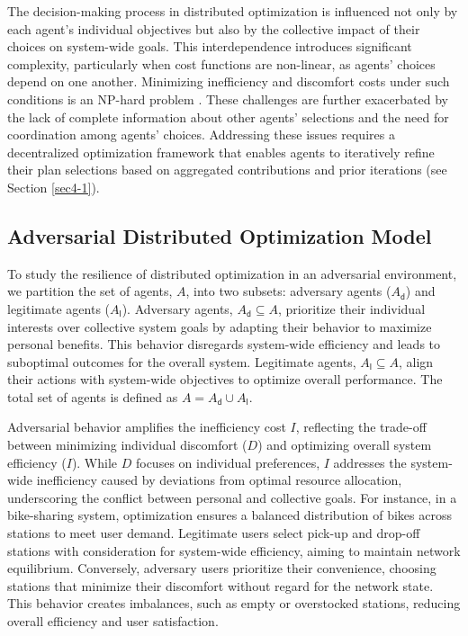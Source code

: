 \documentclass[journal]{IEEEtran}
\newcommand{\Agents}{\ensuremath{A }}
\newcommand{\AdversaryAgents}{\ensuremath{A_\mathsf{d}}}
\newcommand{\LegitimateAgents}{\ensuremath{A_\mathsf{l}}}
\newcommand{\DiscomfortCost}{\ensuremath{D}}
\newcommand{\InefficiencyCost}{\ensuremath{I}}
\begin{document}
The decision-making process in distributed optimization is influenced not only by each agent's individual objectives but also by the collective impact of their choices on system-wide goals. This interdependence introduces significant complexity, particularly when cost functions are non-linear, as agents' choices depend on one another. Minimizing inefficiency and discomfort costs under such conditions is an NP-hard problem \cite{pournaras2018decentralized}. These challenges are further exacerbated by the lack of complete information about other agents' selections and the need for coordination among agents' choices. Addressing these issues requires a decentralized optimization framework that enables agents to iteratively refine their plan selections based on aggregated contributions and prior iterations (see Section \ref{sec4-1}).

\subsection {Adversarial Distributed Optimization Model} 
To study the resilience of distributed optimization in an adversarial environment, we partition the set of agents, \Agents, into two subsets: adversary agents (\AdversaryAgents{}) and legitimate agents (\LegitimateAgents{}). Adversary agents, $\AdversaryAgents \subseteq \Agents$, prioritize their individual interests over collective system goals by adapting their behavior to maximize personal benefits. This behavior disregards system-wide efficiency and leads to suboptimal outcomes for the overall system. Legitimate agents, $\LegitimateAgents \subseteq \Agents$, align their actions with system-wide objectives to optimize overall performance. The total set of agents is defined as $A = \AdversaryAgents \cup \LegitimateAgents$.

Adversarial behavior amplifies the inefficiency cost \InefficiencyCost{}, reflecting the trade-off between minimizing individual discomfort (\DiscomfortCost{}) and optimizing overall system efficiency (\InefficiencyCost{}). While \DiscomfortCost{} focuses on individual preferences, \InefficiencyCost{} addresses the system-wide inefficiency caused by deviations from optimal resource allocation, underscoring the conflict between personal and collective goals. For instance, in a bike-sharing system, optimization ensures a balanced distribution of bikes across stations to meet user demand. Legitimate users select pick-up and drop-off stations with consideration for system-wide efficiency, aiming to maintain network equilibrium. Conversely, adversary users prioritize their convenience, choosing stations that minimize their discomfort without regard for the network state. This behavior creates imbalances, such as empty or overstocked stations, reducing overall efficiency and user satisfaction.
\end{document}

